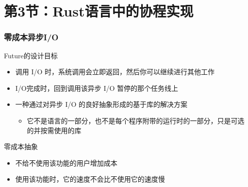 \section{第3节：Rust语言中的协程实现} %
% 
% 
\begin{frame}[fragile]
    \frametitle{零成本异步I/O}
% 
% 
% 
Future的设计目标

    \begin{itemize}
        \item 调用 I/O 时，系统调用会立即返回，然后你可以继续进行其他工作
        \item I/O完成时，回到调用该异步 I/O 暂停的那个任务线上
        \item {\color{red}一种通过对异步 I/O 的良好抽象形成的基于库的解决方案}
    	\begin{itemize}
    	    \item 它不是语言的一部分，也不是每个程序附带的运行时的一部分，只是可选的并按需使用的库
    	\end{itemize}
    \end{itemize}

{\color{red}零成本抽象}
% 
    \begin{itemize}
        \item 不给不使用该功能的用户增加成本
        \item 使用该功能时，它的速度不会比不使用它的速度慢
    \end{itemize}
% 
\end{frame}
